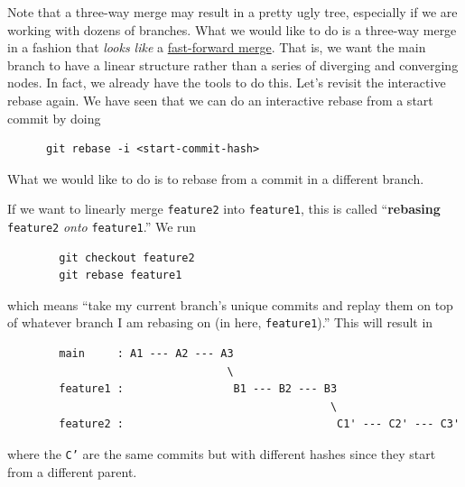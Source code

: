     Note that a three-way merge may result in a pretty ugly tree, especially if we are working with dozens of branches. What we would like to do is a three-way merge in a fashion that \textit{looks like} a \hyperref[def:fast-forward-merge]{fast-forward merge}. That is, we want the main branch to have a linear structure rather than a series of diverging and converging nodes. In fact, we already have the tools to do this. Let's revisit the interactive rebase again. We have seen that we can do an interactive rebase from a start commit by doing 
    \begin{lstlisting}
      git rebase -i <start-commit-hash>
    \end{lstlisting} 
    What we would like to do is to rebase from a commit in a different branch. 

    \begin{definition}[Rebase]
      \label{def:rebase}
      If we want to linearly merge \texttt{feature2} into \texttt{feature1}, this is called ``\textbf{rebasing} \texttt{feature2} \textit{onto} \texttt{feature1}.'' We run 
      \begin{lstlisting}
        git checkout feature2 
        git rebase feature1
      \end{lstlisting} 
      which means ``take my current branch's unique commits and replay them on top of whatever branch I am rebasing on (in here, \texttt{feature1}).'' This will result in 
      \begin{lstlisting}
        main     : A1 --- A2 --- A3
                                  \
        feature1 :                 B1 --- B2 --- B3
                                                  \
        feature2 :                                 C1' --- C2' --- C3' 
      \end{lstlisting} 
      where the \texttt{C'} are the same commits but with different hashes since they start from a different parent. 
    \end{definition} 

